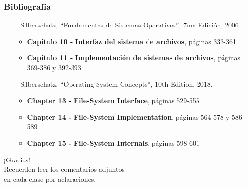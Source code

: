 \documentclass[aspectratio=169]{beamer}
\begin{document}
\begin{frame}[fragile]
    \frametitle{Bibliografía}
    \begin{itemize}
        \setlength\itemsep{0.5cm}
        \item[-] \small Silberschatz, ``Fundamentos de Sistemas Operativos'', 7ma Edición, 2006.\\
        \begin{itemize}
            \item \textbf{Capítulo 10 - Interfaz del sistema de archivos}, páginas 333-361
            \item \textbf{Capítulo 11 - Implementación de sistemas de archivos}, páginas 369-386 y 392-393
        \end{itemize}
        \item[-] \small Silberschatz, ``Operating System Concepts'', 10th Edition, 2018.\\
        \begin{itemize}
            \item \textbf{Chapter 13 - File-System Interface}, páginas 529-555
            \item \textbf{Chapter 14 - File-System Implementation}, páginas 564-578 y 586-589
            \item \textbf{Chapter 15 - File-System Internals}, páginas 598-601
        \end{itemize}
    \end{itemize}
\end{frame}

\begin{frame}[plain]
    \begin{center}
    \vspace{2cm}
    \huge ¡Gracias!\\
    \vspace{2cm}
    \normalsize Recuerden leer los comentarios adjuntos\\ en cada clase por aclaraciones.
    \end{center}
\end{frame}
\end{document}
